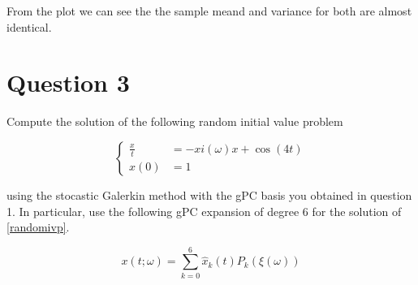 \documentclass[
]{article}
\begin{document}
\begin{figure}


\caption{\label{fig-q2pc}}

\end{figure}%

From the plot we can see the the sample meand and variance for both are
almost identical.

\section{Question 3}\label{question-3}

Compute the solution of the following random initial value problem

\begin{equation}\tag{7}\label{randomivp}
\begin{cases}
    \frac{x}{t} &= -xi(\omega)x + \cos(4t) \\
    x(0) &= 1
\end{cases}
\end{equation}

using the stocastic Galerkin method with the gPC basis you obtained in
question 1. In particular, use the following gPC expansion of degree 6
for the solution of \eqref{randomivp}.

\begin{equation}\tag{8}\label{eight}
x(t;\omega) = \sum_{k=0}^6 \hat{x}_k(t)P_k(\xi(\omega))
\end{equation}
\end{document}
